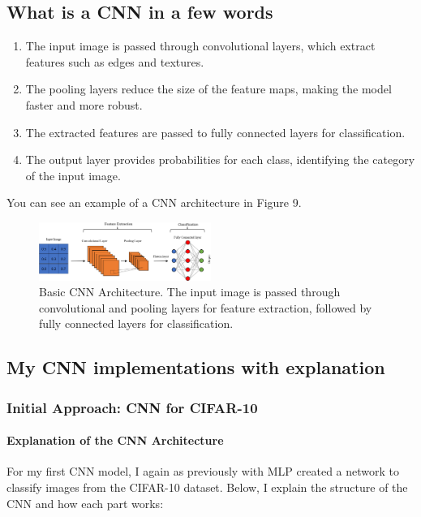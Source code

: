 \documentclass[lettersize,journal]{IEEEtran}
\begin{document}
\subsection{\textbf{What is a CNN in a few words}}
\begin{enumerate}
    \item The input image is passed through convolutional layers, which extract features such as edges and textures.
    \item The pooling layers reduce the size of the feature maps, making the model faster and more robust.
    \item The extracted features are passed to fully connected layers for classification.
    \item The output layer provides probabilities for each class, identifying the category of the input image. 
\end{enumerate}

You can see an example of a CNN architecture in Figure 9.
\begin{figure}[h!]
    \centering
    \includegraphics[width=0.5\textwidth]{CNNEXERCISE.png} 
    \caption{Basic CNN Architecture. The input image is passed through convolutional and pooling layers for feature extraction, followed by fully connected layers for classification.}
    \label{fig:cnn_overview}
\end{figure}

\subsection{\textbf{My CNN implementations with explanation}}
\subsubsection{\textbf{Initial Approach: CNN for CIFAR-10}}
\paragraph{\textbf{Explanation of the CNN Architecture}}
For my first CNN model, I again as previously with MLP created a network to classify images from the CIFAR-10 dataset. Below, I explain the structure of the CNN and how each part works:
\end{document}
